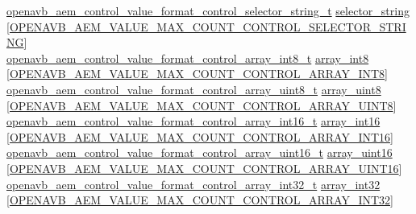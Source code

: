 \begin{DoxyCompactItemize}
\begin{tabbing}
\>\hyperlink{structopenavb__aem__control__value__format__control__selector__string__t}{openavb\_aem\_control\_value\_format\_control\_selector\_string\_t} \hyperlink{structopenavb__aem__descriptor__control__t_a2ec3458373f482d3aaa4197ccb72fd1e}{selector\_string} \mbox{[}\hyperlink{openavb__aem__types__pub_8h_a047b30cbd770d1fbe2ccd7e86aec45d1}{OPENAVB\_AEM\_VALUE\_MAX\_COUNT\_CONTROL\_SELECTOR\_STRING}\mbox{]}\\
\>\hyperlink{structopenavb__aem__control__value__format__control__array__int8__t}{openavb\_aem\_control\_value\_format\_control\_array\_int8\_t} \hyperlink{structopenavb__aem__descriptor__control__t_ab9d35f30a73318588e03e709376fb4c3}{array\_int8} \mbox{[}\hyperlink{openavb__aem__types__pub_8h_a71caa1502453ada3e89c38d07d4ff04b}{OPENAVB\_AEM\_VALUE\_MAX\_COUNT\_CONTROL\_ARRAY\_INT8}\mbox{]}\\
\>\hyperlink{structopenavb__aem__control__value__format__control__array__uint8__t}{openavb\_aem\_control\_value\_format\_control\_array\_uint8\_t} \hyperlink{structopenavb__aem__descriptor__control__t_a636afa37e18cf00ab648b5584a69fb72}{array\_uint8} \mbox{[}\hyperlink{openavb__aem__types__pub_8h_a653bbcc985695806b3cc2d3dd4fe2a42}{OPENAVB\_AEM\_VALUE\_MAX\_COUNT\_CONTROL\_ARRAY\_UINT8}\mbox{]}\\
\>\hyperlink{structopenavb__aem__control__value__format__control__array__int16__t}{openavb\_aem\_control\_value\_format\_control\_array\_int16\_t} \hyperlink{structopenavb__aem__descriptor__control__t_a506910324c0047b5cba391fe474183ce}{array\_int16} \mbox{[}\hyperlink{openavb__aem__types__pub_8h_ae4622ff67fc3693ce08b4239f278059f}{OPENAVB\_AEM\_VALUE\_MAX\_COUNT\_CONTROL\_ARRAY\_INT16}\mbox{]}\\
\>\hyperlink{structopenavb__aem__control__value__format__control__array__uint16__t}{openavb\_aem\_control\_value\_format\_control\_array\_uint16\_t} \hyperlink{structopenavb__aem__descriptor__control__t_a46e09a17761b8763005e161ba4c9e795}{array\_uint16} \mbox{[}\hyperlink{openavb__aem__types__pub_8h_a2522013713e7ab098bd8e4e2a1b9d587}{OPENAVB\_AEM\_VALUE\_MAX\_COUNT\_CONTROL\_ARRAY\_UINT16}\mbox{]}\\
\>\hyperlink{structopenavb__aem__control__value__format__control__array__int32__t}{openavb\_aem\_control\_value\_format\_control\_array\_int32\_t} \hyperlink{structopenavb__aem__descriptor__control__t_a588360f076a040da7712b2d7093c7516}{array\_int32} \mbox{[}\hyperlink{openavb__aem__types__pub_8h_a42a3cf9679c211b5c4bc2c55b77b8249}{OPENAVB\_AEM\_VALUE\_MAX\_COUNT\_CONTROL\_ARRAY\_INT32}\mbox{]}\\

\end{tabbing}
\end{DoxyCompactItemize}

